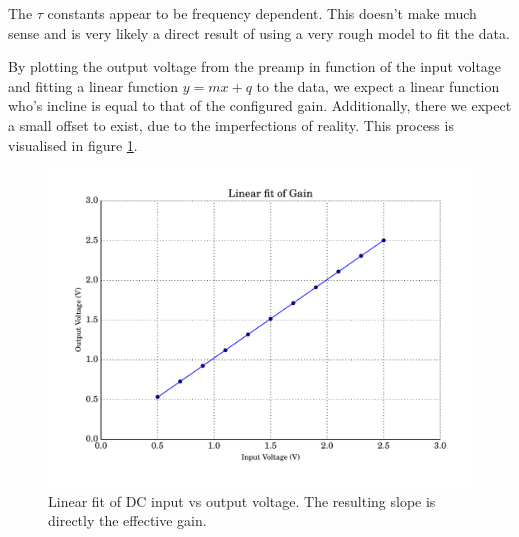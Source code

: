 The $\tau$ constants  appear to be frequency dependent. This doesn't make much
sense and is very likely a direct  result  of  using a very rough model to fit
the data.

By  plotting  the output voltage from the preamp  in  function  of  the  input
voltage and fitting a linear function $y=mx+q$ to the data, we expect a linear
function who's  incline is equal to that of the configured gain. Additionally,
there  we expect a small offset to exist, due to the imperfections of reality.
This  process  is  visualised  in  figure \ref{fig:linear_fit}.

\begin{figure}
    \centering
    \includegraphics[width=.85\linewidth]{images/plots/linear_fit.pdf}
    \caption{Linear fit of DC input vs output voltage. The resulting slope is directly the effective gain.}
    \label{fig:linear_fit}
\end{figure}

